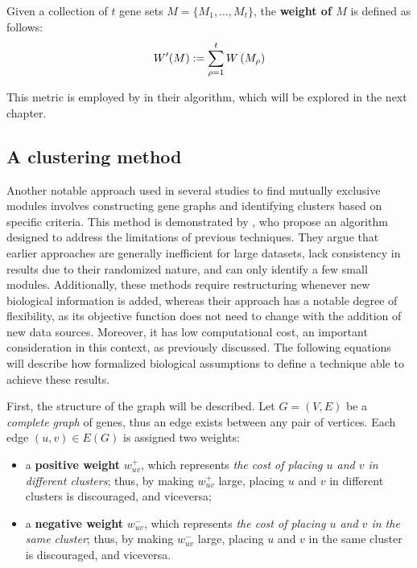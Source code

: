 \begin{definition}
    Given a collection of $t$ gene sets $M = \{ M_1, \ldots, M_t \}$, the \textbf{weight of $M$} is defined as follows: $$W'(M) := \sum_{\rho = 1}^t{W \left(M_\rho\right)}$$
\end{definition}

This metric is employed by \textcite{multi-dendrix} in their algorithm, which will be explored in the next chapter.

\subsection{A clustering method} \label{c3_chap2}

Another notable approach used in several studies to find mutually exclusive modules involves constructing gene graphs and identifying clusters based on specific criteria. This method is demonstrated by \textcite{c3}, who propose an algorithm designed to address the limitations of previous techniques. They argue that earlier approaches are generally inefficient for large datasets, lack consistency in results due to their randomized nature, and can only identify a few small modules. Additionally, these methods require restructuring whenever new biological information is added, whereas their approach has a notable degree of flexibility, as its objective function does not need to change with the addition of new data sources. Moreover, it has low computational cost, an important consideration in this context, as previously discussed. The following equations will describe how \textcite{c3} formalized biological assumptions to define a technique able to achieve these results.

First, the structure of the graph will be described. Let $G = (V, E)$ be a \textit{complete graph} of genes, thus an edge exists between any pair of vertices. Each edge $(u, v) \in E(G)$ is assigned two weights:

\begin{itemize}
    \item a \textbf{positive weight} $w_{uv}^+$, which represents \textit{the cost of placing $u$ and $v$ in different clusters}; thus, by making $w_{uv}^+$ large, placing $u$ and $v$ in different clusters is discouraged, and viceversa;
    \item a \textbf{negative weight} $w_{uv}^-$, which represents \textit{the cost of placing $u$ and $v$ in the same cluster}; thus, by making $w_{uv}^-$ large, placing $u$ and $v$ in the same cluster is discouraged, and viceversa.
\end{itemize}

